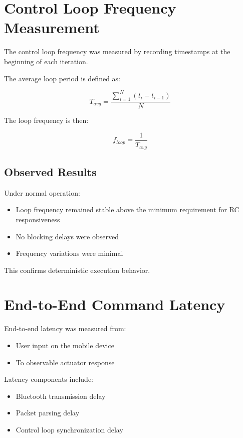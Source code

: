 
\section{Control Loop Frequency Measurement}

The control loop frequency was measured by recording timestamps at the beginning of each iteration.

The average loop period is defined as:

\[
T_{avg} = \frac{\sum_{i=1}^{N} (t_i - t_{i-1})}{N}
\]

The loop frequency is then:

\[
f_{loop} = \frac{1}{T_{avg}}
\]

\subsection{Observed Results}

Under normal operation:

\begin{itemize}
	\item Loop frequency remained stable above the minimum requirement for RC responsiveness
	\item No blocking delays were observed
	\item Frequency variations were minimal
\end{itemize}

This confirms deterministic execution behavior.


\section{End-to-End Command Latency}

End-to-end latency was measured from:

\begin{itemize}
	\item User input on the mobile device
	\item To observable actuator response
\end{itemize}

Latency components include:

\begin{itemize}
	\item Bluetooth transmission delay
	\item Packet parsing delay
	\item Control loop synchronization delay
\end{itemize}

